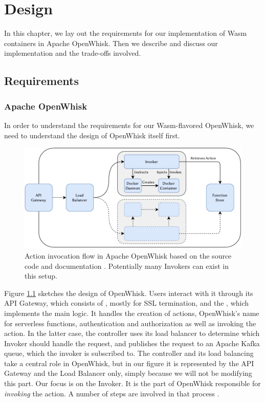 \chapter{Design}
\label{chapter:design}

In this chapter, we lay out the requirements for our implementation of Wasm containers in Apache OpenWhisk. Then we describe and discuss our implementation and the trade-offs involved.

\section{Requirements}

\subsection{Apache OpenWhisk}

In order to understand the requirements for our Wasm-flavored OpenWhisk, we need to understand the design of OpenWhisk itself first.

\begin{figure}
    \includegraphics{figures/OpenWhiskActionInvocationFlow.pdf}
    \caption{Action invocation flow in Apache OpenWhisk based on the source code and documentation \cite{OpenWhiskSystemDesign}. Potentially many Invokers can exist in this setup.}
    \label{fig:openwhisk-action-invocation-flow}
\end{figure}

Figure \ref{fig:openwhisk-action-invocation-flow} sketches the design of OpenWhisk. Users interact with it through its API Gateway, which consists of , mostly for SSL termination, and the , which implements the main logic. It handles the creation of actions, OpenWhisk's name for serverless functions, authentication and authorization as well as invoking the action.
In the latter case, the controller uses its load balancer to determine which Invoker should handle the request, and publishes the request to an Apache Kafka queue, which the invoker is subscribed to. The controller and its load balancing take a central role in OpenWhisk, but in our figure it is represented by the API Gateway and the Load Balancer only, simply because we will not be modifying this part.
Our focus is on the Invoker. It is the part of OpenWhisk responsible for \emph{invoking} the action. A number of steps are involved in that process \cite{OpenWhiskSystemDesign}.

